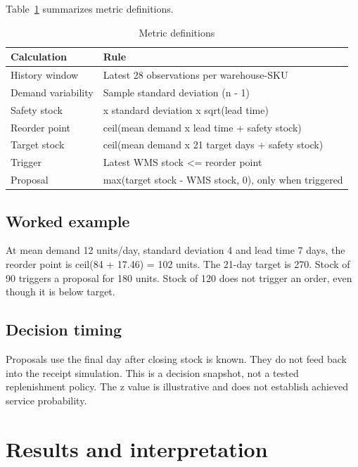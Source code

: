 \documentclass[conference,letterpaper]{IEEEtran}
\begin{document}
Table~\ref{tab:3} summarizes metric definitions.

\begin{table}[H]
\caption{Metric definitions}\label{tab:3}
\centering\footnotesize
\setlength{\tabcolsep}{3pt}
\begin{tabularx}{\columnwidth}{>{\raggedright\arraybackslash}X >{\raggedright\arraybackslash}X}
\hline
\textbf{Calculation} & \textbf{Rule} \\
\hline
History window & Latest 28 observations per warehouse-SKU \\
Demand variability & Sample standard deviation (n - 1) \cite{r2} \\
Safety stock & 1.65 x standard deviation x sqrt(lead time) \\
Reorder point & ceil(mean demand x lead time + safety stock) \\
Target stock & ceil(mean demand x 21 target days + safety stock) \\
Trigger & Latest WMS stock <= reorder point \\
Proposal & max(target stock - WMS stock, 0), only when triggered \\
\hline
\end{tabularx}
\end{table}

\subsection{Worked example}

At mean demand 12 units/day, standard deviation 4 and lead time 7 days, the reorder point is ceil(84 + 17.46) = 102 units. The 21-day target is 270. Stock of 90 triggers a proposal for 180 units. Stock of 120 does not trigger an order, even though it is below target.


\subsection{Decision timing}

Proposals use the final day after closing stock is known. They do not feed back into the receipt simulation. This is a decision snapshot, not a tested replenishment policy. The z value is illustrative and does not establish achieved service probability.


\section{Results and interpretation}
\end{document}
